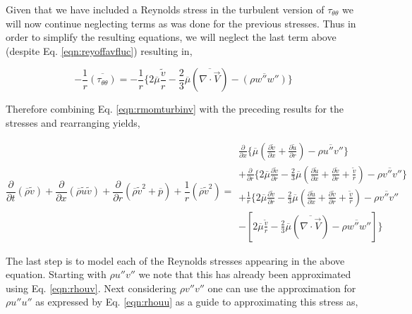 	Given that we have included a Reynolds stress in the turbulent version of $\tau_{\theta \theta}$ we will now 
continue neglecting terms as was done for the previous stresses.  Thus in order to simplify the resulting equations,
we will neglect the last term above (despite Eq. \ref{eqn:reyoffavfluc}) resulting in,

\begin{equation}
	-\frac{1}{r}\overline{(\tau_{\theta \theta})} = -\frac{1}{r}\Big\{
	 2\overline{\mu}\frac{\tilde{v}}{r} -\frac{2}{3}\overline{\mu}(\overline{\nabla \cdot \vec{V}}) 
	-\overline{(\rho w'' w'')}\Big\}
\label{eqn:tauthetathetaturb}
\end{equation}

	Therefore combining Eq. \ref{eqn:rmomturbinv} with the preceding results for the stresses and rearranging
yields,

\begin{displaymath}
	\frac{\partial}{\partial t}(\overline{\rho}\tilde{v}) + \frac{\partial}{\partial x}
	(\overline{\rho}\tilde{u}\tilde{v}) + \frac{\partial}{\partial r}(\overline{\rho}\tilde{v}^2 + \overline{p})
	+ \frac{1}{r}(\overline{\rho}\tilde{v}^2) =
	\begin{array}{c}
		\frac{\partial}{\partial x}\Big\{\overline{\mu}
		(\frac{\partial \tilde{v}}{\partial x} + \frac{\partial \tilde{u}}{\partial r}) - \overline{\rho u'' v''}\Big\} 
		\\ + \frac{\partial}{\partial r}\Big\{
		2\overline{\mu}\frac{\partial \tilde{v}}{\partial r} - \frac{2}{3}\overline{\mu} (\frac{\partial \tilde{u}}
		{\partial x} + \frac{\partial \tilde{v}}{\partial r} + \frac{\tilde{v}}{r}) 
		- \overline{\rho v'' v''}\Big\}  \\
		+ \frac{1}{r}\Big\{
		2\overline{\mu}\frac{\partial \tilde{v}}{\partial r} - \frac{2}{3}\overline{\mu} (\frac{\partial \tilde{u}}
		{\partial x} + \frac{\partial \tilde{v}}{\partial r} + \frac{\tilde{v}}{r}) - \overline{\rho v'' v''}
		\\ 
	 	-[ 2\overline{\mu}\frac{\tilde{v}}{r} - \frac{2}{3}\overline{\mu}(\overline{\nabla \cdot \vec{V}}) 
		 - \overline{\rho w'' w''}] 
		\Big\}
	\end{array}
\end{displaymath}

	The last step is to model each of the Reynolds stresses appearing in the above equation.  Starting with
$\rho u'' v''$ we note that this has already been approximated using Eq. \ref{eqn:rhouv}.  Next considering
$\rho v'' v''$ one can use the approximation for $\rho u'' u''$ as expressed by Eq. \ref{eqn:rhouu} as a guide
to approximating this stress as,

